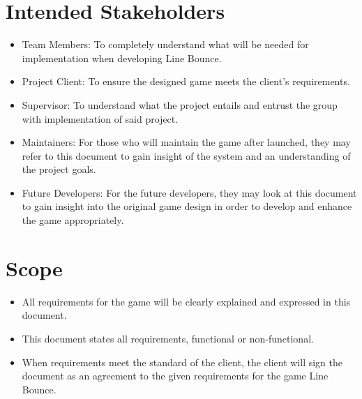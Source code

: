 \section{Intended Stakeholders }
\begin{itemize}
\item Team Members: To completely understand what will be needed for implementation
when developing Line Bounce. 
\item Project Client: To ensure the designed game meets the client\textquoteright{}s
requirements. 
\item Supervisor: To understand what the project entails and entrust the
group with implementation of said project. 
\item Maintainers: For those who will maintain the game after launched,
they may refer to this document to gain insight of the system and
an understanding of the project goals. 
\item Future Developers: For the future developers, they may look at this
document to gain insight into the original game design in order to
develop and enhance the game appropriately.
\end{itemize}

\section{Scope }
\begin{itemize}
\item All requirements for the game will be clearly explained and expressed
in this document. 
\item This document states all requirements, functional or non-functional. 
\item When requirements meet the standard of the client, the client will
sign the document as an agreement to the given requirements for the
game Line Bounce.\end{itemize}

